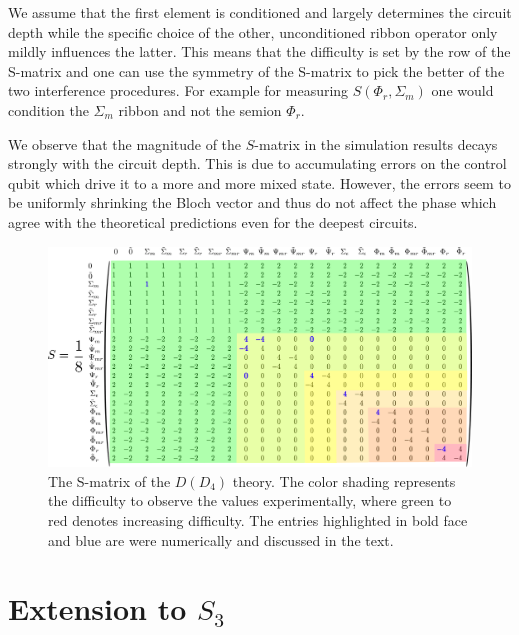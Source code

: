 \documentclass[two column]{article}
\begin{document}
We assume that the first element is conditioned and largely determines the circuit depth while the specific choice of the other, unconditioned ribbon operator only mildly influences the latter. This means that the difficulty is set by the row of the S-matrix and one can use the symmetry of the S-matrix to pick the better of the two interference procedures. For example for measuring $S(\Phi_r, \Sigma_m)$ one would condition the $\Sigma_m$ ribbon and not the semion $\Phi_r$.

We observe that the magnitude of the $S$-matrix in the simulation results decays strongly with the circuit depth. This is due to accumulating errors on the control qubit which drive it to a more and more mixed state. However, the errors seem to be uniformly shrinking the Bloch vector and thus do not affect the phase which agree with the theoretical predictions even for the deepest circuits.







 



\begin{figure}
	\centering
	\includegraphics[width=\textwidth]{Figures/S_mat_with_diff.pdf}
	\caption{The S-matrix of the $D(D_4)$ theory. The color shading represents the difficulty to observe the values experimentally, where green to red denotes increasing difficulty. The entries highlighted in bold face and blue are were numerically and discussed in the text.}
	\label{fig:Smat_diff}
\end{figure}

\section{Extension to $S_3$}\label{sec:other_gauge}
\end{document}

